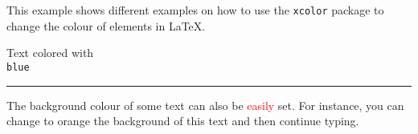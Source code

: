 \documentclass{article}
\begin{document}
This example shows different examples on how to use the \texttt{xcolor} package 
to change the colour of elements in \LaTeX.

{\color{blue}Text colored with \texttt{\\blue}}

\noindent
{\color{red} \rule{\linewidth}{0.5mm} }

The background colour of some text can also be \textcolor{red}{easily} set. For 
instance, you can change to orange the background of \colorbox{BurntOrange}{this 
text} and then continue typing.
\end{document}
